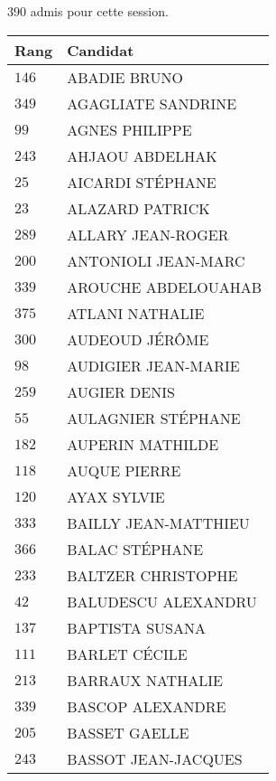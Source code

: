 



  $390$ admis pour cette session.

  \begin{xltabular}{\linewidth}{|l|X|}
    \hline
    \textbf{Rang} & \textbf{Candidat} \\
    \hline
    $146$ & ABADIE BRUNO \\
    \hline
    $349$ & AGAGLIATE SANDRINE \\
    \hline
    $99$ & AGNES PHILIPPE \\
    \hline
    $243$ & AHJAOU ABDELHAK \\
    \hline
    $25$ & AICARDI STÉPHANE \\
    \hline
    $23$ & ALAZARD PATRICK \\
    \hline
    $289$ & ALLARY JEAN-ROGER \\
    \hline
    $200$ & ANTONIOLI JEAN-MARC \\
    \hline
    $339$ & AROUCHE ABDELOUAHAB \\
    \hline
    $375$ & ATLANI NATHALIE \\
    \hline
    $300$ & AUDEOUD JÉRÔME \\
    \hline
    $98$ & AUDIGIER JEAN-MARIE \\
    \hline
    $259$ & AUGIER DENIS \\
    \hline
    $55$ & AULAGNIER STÉPHANE \\
    \hline
    $182$ & AUPERIN MATHILDE \\
    \hline
    $118$ & AUQUE PIERRE \\
    \hline
    $120$ & AYAX SYLVIE \\
    \hline
    $333$ & BAILLY JEAN-MATTHIEU \\
    \hline
    $366$ & BALAC STÉPHANE \\
    \hline
    $233$ & BALTZER CHRISTOPHE \\
    \hline
    $42$ & BALUDESCU ALEXANDRU \\
    \hline
    $137$ & BAPTISTA SUSANA \\
    \hline
    $111$ & BARLET CÉCILE \\
    \hline
    $213$ & BARRAUX NATHALIE \\
    \hline
    $339$ & BASCOP ALEXANDRE \\
    \hline
    $205$ & BASSET GAELLE \\
    \hline
    $243$ & BASSOT JEAN-JACQUES \\

\end{xltabular}
